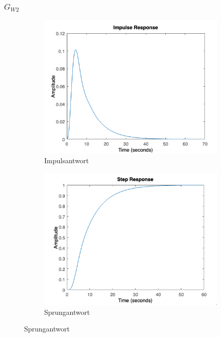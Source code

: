 \documentclass{article}
\begin{document}
 				\subsubsection{$G_{W2}$}
					\begin{figure}[ht]
 						\begin{subfigure}{0.5\textwidth}
 							\includegraphics[width=1.2\linewidth]{./Impulsantwort_GW2.png}
						    \caption{Impulsantwort}
						    \label{fig:subimg2_1}
					    \end{subfigure}
					    \begin{subfigure}{0.5\textwidth}
					    		\includegraphics[width=1.2\linewidth]{./Sprungantwort_GW2.png}
					    		\caption{Sprungantwort}
					    		\label{fig:subimg2_2}
					    \end{subfigure}
 					\end{figure}
\end{document}
